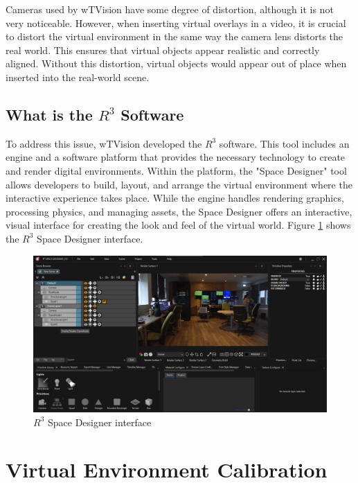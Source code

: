 \noindent Cameras used by wTVision have some degree of distortion, although it is not very noticeable. However, when inserting virtual overlays in a video, it is crucial to distort the virtual environment in the same way the camera lens distorts the real world. This ensures that virtual objects appear realistic and correctly aligned. Without this distortion, virtual objects would appear out of place when inserted into the real-world scene.

\subsection{What is the $R^3$ Software}

\noindent To address this issue, wTVision developed the $R^3$ software. This tool includes an engine and a software platform that provides the necessary technology to create and render digital environments. Within the platform, the "Space Designer" tool allows developers to build, layout, and arrange the virtual environment where the interactive experience takes place. While the engine handles rendering graphics, processing physics, and managing assets, the Space Designer offers an interactive, visual interface for creating the look and feel of the virtual world. Figure \ref{fig:interface} shows the $R^3$ Space Designer interface.

\begin{figure}[h]
    \centering
    \includegraphics[width=\textwidth]{Images/02stateart/interface.png}
    \caption{$R^3$ Space Designer interface}
    \label{fig:interface}
\end{figure}

\section{Virtual Environment Calibration}

